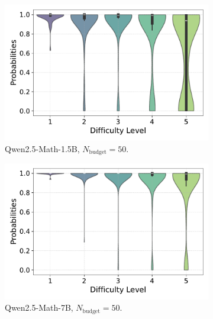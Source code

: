 \begin{figure}[h!]
\begin{subfigure}{0.49\textwidth}
      \includegraphics[width=\textwidth]{figs/QWEN-MATH-1.5B_violin_maj50_probability_adaptive_04_NO_ground_truth.pdf}
        \caption{Qwen2.5-Math-1.5B, $N_{\text{budget}}=50$.}
      \label{fig:QWEN-MATH-1.5B_budget_50_NO_04}
  \end{subfigure}
  \hfill
  \begin{subfigure}{0.49\textwidth}
      \centering
      \includegraphics[width=\textwidth]{figs/QWEN-MATH-7B_violin_maj50_probability_adaptive_04_NO_ground_truth.pdf}
        \caption{Qwen2.5-Math-7B, $N_{\text{budget}}=50$.}
      \label{fig:QWEN-MATH-7B_budget_50_NO_04}
  \end{subfigure}
  \vfill
  \begin{subfigure}{0.49\textwidth}
      \centering

\end{subfigure}
\end{figure}
